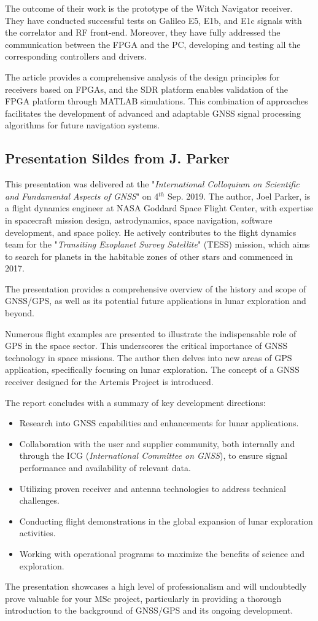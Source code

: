 The outcome of their work is the prototype of the Witch Navigator receiver. They have conducted successful tests on Galileo E5, E1b, and E1c signals with the correlator and RF front-end. Moreover, they have fully addressed the communication between the FPGA and the PC, developing and testing all the corresponding controllers and drivers.

The article provides a comprehensive analysis of the design principles for receivers based on FPGAs, and the SDR platform enables validation of the FPGA platform through MATLAB simulations. This combination of approaches facilitates the development of advanced and adaptable GNSS signal processing algorithms for future navigation systems.

\subsection{Presentation Sildes from J. Parker\texorpdfstring{\cite{RN146}}{}}
This presentation was delivered at the "\textit{International Colloquium on Scientific and Fundamental Aspects of GNSS}" on 4$^{th}$ Sep. 2019. The author, Joel Parker, is a flight dynamics engineer at NASA Goddard Space Flight Center, with expertise in spacecraft mission design, astrodynamics, space navigation, software development, and space policy. He actively contributes to the flight dynamics team for the "\textit{Transiting Exoplanet Survey Satellite}" (TESS) mission, which aims to search for planets in the habitable zones of other stars and commenced in 2017.

The presentation provides a comprehensive overview of the history and scope of GNSS/GPS, as well as its potential future applications in lunar exploration and beyond.

Numerous flight examples are presented to illustrate the indispensable role of GPS in the space sector. This underscores the critical importance of GNSS technology in space missions. The author then delves into new areas of GPS application, specifically focusing on lunar exploration. The concept of a GNSS receiver designed for the Artemis Project is introduced.

The report concludes with a summary of key development directions:
\begin{itemize}
    \item Research into GNSS capabilities and enhancements for lunar applications.
    \item Collaboration with the user and supplier community, both internally and through the ICG (\textit{International Committee on GNSS}), to ensure signal performance and availability of relevant data.
    \item Utilizing proven receiver and antenna technologies to address technical challenges.
    \item Conducting flight demonstrations in the global expansion of lunar exploration activities.
    \item Working with operational programs to maximize the benefits of science and exploration.
\end{itemize}

The presentation showcases a high level of professionalism and will undoubtedly prove valuable for your MSc project, particularly in providing a thorough introduction to the background of GNSS/GPS and its ongoing development.
